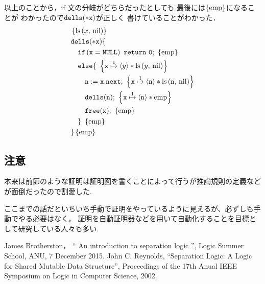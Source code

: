 \documentclass[a4paper, 10pt]{ltjsarticle}
\begin{document}
  以上のことから，if 文の分岐がどちらだったとしても
  最後には$\left\{\mathrm{emp}\right\}$になることが
  わかったので$\mathtt{dells(*x)}$が正しく
  書けていることがわかった．
  \begin{align*}
   &  \left\{\mathprls{x}{\mathvalnil}\right\}\\
   & \mathprogramsy{dells(*x)} \{  \\
   &\quad \mathprogramsy{if\left(x = NULL\right)\ return\ 0;}\ \left\{\mathemp\right\}
   \\
     &\quad   \mathprogramsy{else \{}\  
   \left\{ \mathprogramsy{x} \mathpointer{1} \left\langle y \right\rangle * \mathprls{y}{\mathvalnil}  \right\} \\
     &\qquad  \mathprogramsy{n := x.next;}\  \left\{ \mathprogramsy{x} \mathpointer{1} \left\langle \mathprogramsy{n} \right\rangle * \mathprls{\mathprogramsy{n}}{\mathvalnil}  \right\} \\
     &\qquad  \mathprogramsy{dells(n);}\ \left\{ \mathprogramsy{x} \mathpointer{1} \left\langle \mathprogramsy{n} \right\rangle * \mathemp \right\} \\
      &\qquad  \mathprogramsy{free(x);}\ \left\{ \mathemp \right\} \\
      &\quad \mathprogramsy{\}}\ \left\{ \mathemp \right\} \\
      &\mathprogramsy{\}} \left\{\mathemp\right\}
  \end{align*}

  \subsection*{注意}

  本来は前節のような証明は証明図を書くことによって行うが推論規則の定義などが面倒だったので割愛した.

  ここまでの話だといちいち手動で証明をやっているように見えるが、必ずしも手動でやる必要はなく，
  証明を自動証明器などを用いて自動化することを目標として研究している人々も多い.

  \begin{thebibliography}{9}
    James Brotherston，
	   `` An introduction to separation logic '', 
	   Logic Summer School, ANU, 7 December 2015.
    John C. Reynolds, ``Separation Logic: A Logic for Shared Mutable Data Structure'', Proceedings of the 17th Anual IEEE Symposium on Logic in Computer Science, 2002.
  \end{thebibliography} 
\end{document}
